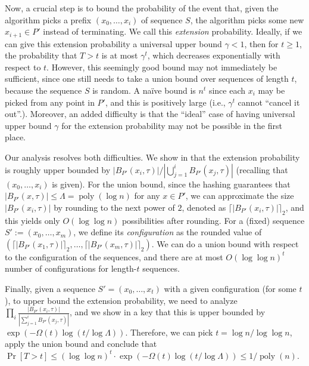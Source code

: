 \documentclass[11pt,letterpaper]{article}
\theoremstyle{plain}
\theoremstyle{definition}
\theoremstyle{remark}
\DeclareMathOperator{\poly}{poly}
\begin{document}
Now, a crucial step is to bound the probability of the event that, given the algorithm picks a prefix $(x_0, \ldots, x_i)$ of sequence $S$,
the algorithm picks some new $x_{i + 1} \in P'$ instead of terminating.
We call this \emph{extension} probability.
Ideally, if we can give this extension probability a universal upper bound $\gamma < 1$,
then for $t \geq 1$,
the probability that $T > t$ is at most $\gamma^t$, which decreases exponentially with respect to $t$.
However, this seemingly good bound may not immediately be sufficient,
since one still needs to take a union bound over sequences of length $t$, because the sequence $S$ is random.
A na\"ive bound is $n^t$ since each $x_i$ may be picked from any point in $P'$, and this is positively large (i.e., $\gamma^t$ cannot ``cancel it out''.).
Moreover, an added difficulty is that the ``ideal'' case of having universal upper bound $\gamma$ for the extension probability may not be possible in the first place.

Our analysis resolves both difficulties.
We show in  that the extension probability is roughly upper bounded by $|B_{P'}(x_i, \tau)| / |\bigcup_{j = 1}^i B_{P'}(x_j, \tau)|$ (recalling that $(x_0, \ldots, x_i)$ is given).
For the union bound,
since the hashing guarantees that $|B_{P'}(x, \tau)| \leq \Lambda = \poly(\log n)$ for any $x \in P'$,
we can approximate the size $|B_{P'}(x_i, \tau)|$ by rounding to the next power of $2$, denoted as $\lceil |B_{P'}(x_i, \tau)| \rceil_2$,
and this yields only $O(\log\log n)$ possibilities after rounding.
For a (fixed) sequence $S' := (x_0, \ldots, x_m)$,
we define its \emph{configuration} as the rounded value of $(\lceil |B_{P'}(x_1, \tau)| \rceil_2, \ldots, \lceil |B_{P'}(x_m, \tau)| \rceil_2)$.
We can do a union bound with respect to the configuration of the sequences,
and there are at most $O(\log \log n)^t$ number of configurations for length-$t$ sequences.

Finally, given a sequence $S' = (x_0, \ldots, x_t)$ with a given configuration (for some $t$),
to upper bound the extension probability,
we need to analyze $\prod_{i} \frac{|B_{P'}(x_i, \tau)|}{|\sum_{j = 1}^i B_{P'}(x_j, \tau)|}$,
and we show in a key  that this is upper bounded by $\exp(-\Omega(t) \log(t / \log \Lambda))$.
Therefore, we can pick $t = \log n / \log \log n$,
apply the union bound and conclude that $\Pr[T > t] \leq (\log \log n)^t \cdot \exp(-\Omega(t) \log(t / \log \Lambda)) \leq 1 / \poly(n)$.
\end{document}
